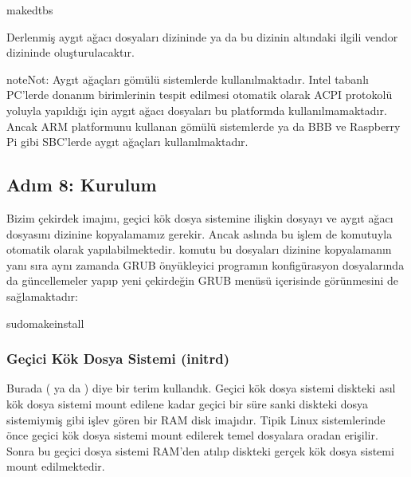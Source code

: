 \documentclass[a4paper,10pt,turkish]{sphinxmanual}
\begin{document}
\begin{sphinxVerbatim}[commandchars=\\\{\}]
\PYGZdl{}makedtbs
\end{sphinxVerbatim}

\sphinxAtStartPar
Derlenmiş aygıt ağacı dosyaları  dizininde ya da bu dizinin altındaki
ilgili vendor dizininde oluşturulacaktır.

\begin{sphinxadmonition}{note}{Not:}
\sphinxAtStartPar
Aygıt ağaçları gömülü sistemlerde kullanılmaktadır. Intel tabanlı PC’lerde donanım birimlerinin
tespit edilmesi otomatik olarak ACPI protokolü yoluyla yapıldığı için aygıt ağacı dosyaları bu
platformda kullanılmamaktadır. Ancak ARM platformunu kullanan gömülü sistemlerde ya da BBB ve
Raspberry Pi gibi SBC’lerde aygıt ağaçları kullanılmaktadır.
\end{sphinxadmonition}


\subsection{Adım 8: Kurulum}
\label{\detokenize{kernelcompilation:adim-8-kurulum}}
\sphinxAtStartPar
Bizim çekirdek imajını, geçici kök dosya sistemine ilişkin dosyayı ve aygıt ağacı dosyasını 
dizinine kopyalamamız gerekir. Ancak aslında bu işlem de  komutuyla otomatik olarak
yapılabilmektedir.  komutu bu dosyaları  dizinine kopyalamanın yanı sıra
aynı zamanda GRUB önyükleyici programın konfigürasyon dosyalarında da güncellemeler yapıp yeni
çekirdeğin GRUB menüsü içerisinde görünmesini de sağlamaktadır:

\begin{sphinxVerbatim}[commandchars=\\\{\}]
\PYGZdl{}sudomakeinstall
\end{sphinxVerbatim}


\subsubsection{Geçici Kök Dosya Sistemi (initrd)}
\label{\detokenize{kernelcompilation:gecici-kok-dosya-sistemi-initrd}}
\sphinxAtStartPar
Burada  ( ya da ) diye bir terim kullandık.
Geçici kök dosya sistemi diskteki asıl kök dosya sistemi mount edilene kadar geçici bir süre sanki
diskteki dosya sistemiymiş gibi işlev gören bir RAM disk imajıdır. Tipik Linux sistemlerinde önce
geçici kök dosya sistemi mount edilerek temel dosyalara oradan erişilir. Sonra bu geçici dosya sistemi
RAM’den atılıp diskteki gerçek kök dosya sistemi mount edilmektedir.
\end{document}
